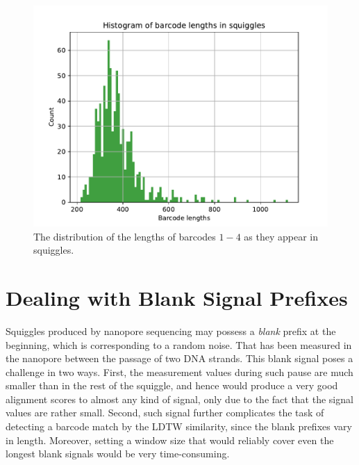\begin{figure}[!ht]
    \centering
    \includegraphics[scale=0.8]{images/barcode_lengths.pdf}
    \caption[Barcode lengths distribution]{The distribution of the lengths of barcodes $1-4$ as they appear in squiggles.}
    \label{fig:barcode_lengts}
\end{figure}


\section{Dealing with Blank Signal Prefixes}
Squiggles produced by nanopore sequencing may possess a \textit{blank} prefix at the beginning, which is corresponding to a random noise. That has been measured in the nanopore between the passage of two DNA strands. This blank signal poses a challenge in two ways. First, the measurement values during such pause are much smaller than in the rest of the squiggle, and hence would produce a very good alignment scores to almost any kind of signal, only due to the fact that the signal values are rather small. Second, such signal further complicates the task of detecting a barcode match by the LDTW similarity, since the blank prefixes vary in length. Moreover, setting a window size that would reliably cover even the longest blank signals would be very time-consuming.

